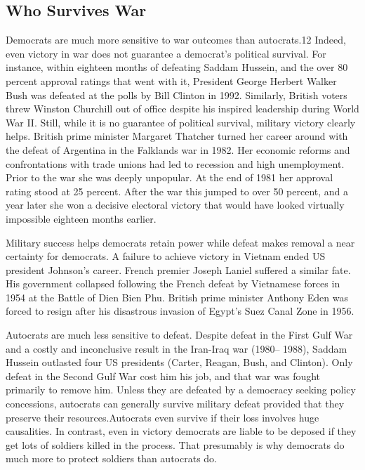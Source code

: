 \documentclass[10pt]{article}
\begin{document}
\subsection{Who Survives War}

{\large Democrats are much more sensitive to war outcomes than autocrats.12
Indeed, even victory in war does not guarantee a democrat's political survival.
For instance, within eighteen months of defeating Saddam Hussein, and the over 80
percent approval ratings that went with it, President George Herbert Walker Bush
was defeated at the polls by Bill Clinton in 1992. Similarly, British voters
threw Winston Churchill out of office despite his inspired leadership during
World War II. Still, while it is no guarantee of political survival, military
victory clearly helps. British prime minister Margaret Thatcher turned her career
around with the defeat of Argentina in the Falklands war in 1982. Her economic
reforms and confrontations with trade unions had led to recession and high
unemployment. Prior to the war she was deeply unpopular. At the end of 1981 her
approval rating stood at 25 percent. After the war this jumped to over 50
percent, and a year later she won a decisive electoral victory that would have
looked virtually impossible eighteen months earlier.}

{\large Military success helps democrats retain power while defeat makes removal
a near certainty for democrats. A failure to achieve victory in Vietnam ended US
president Johnson's career. French premier Joseph Laniel suffered a similar fate.
His government collapsed following the French defeat by Vietnamese forces in 1954
at the Battle of Dien Bien Phu. British prime minister Anthony Eden was forced to
resign after his disastrous invasion of Egypt's Suez Canal Zone in 1956.}

{\large Autocrats are much less sensitive to defeat. Despite defeat in the First
Gulf War and a costly and inconclusive result in the Iran-Iraq war (1980-- 1988),
Saddam Hussein outlasted four US presidents (Carter, Reagan, Bush, and Clinton).
Only defeat in the Second Gulf War cost him his job, and that war was fought
primarily to remove him. Unless they are defeated by a democracy seeking policy
concessions, autocrats can generally survive military defeat provided that they
preserve their resources.Autocrats even survive if their loss involves huge
causalities. In contrast, even in victory democrats are liable to be deposed if
they get lots of soldiers killed in the process. That presumably is why democrats
do much more to protect soldiers than autocrats do.}
\end{document}
